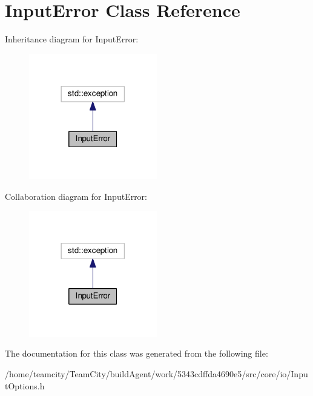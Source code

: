 \hypertarget{classInputError}{}\section{Input\+Error Class Reference}
\label{classInputError}


Inheritance diagram for Input\+Error\+:\nopagebreak
\begin{figure}[H]
\begin{center}
\leavevmode
\includegraphics[width=158pt]{classInputError__inherit__graph}
\end{center}
\end{figure}


Collaboration diagram for Input\+Error\+:\nopagebreak
\begin{figure}[H]
\begin{center}
\leavevmode
\includegraphics[width=158pt]{classInputError__coll__graph}
\end{center}
\end{figure}


The documentation for this class was generated from the following file\+:\begin{DoxyCompactItemize}
\item 
/home/teamcity/\+Team\+City/build\+Agent/work/5343cdffda4690e5/src/core/io/Input\+Options.\+h\end{DoxyCompactItemize}
